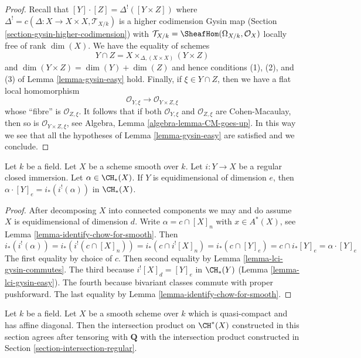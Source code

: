 \begin{proof}
Recall that $[Y] \cdot [Z] = \Delta^!([Y \times Z])$ where
$\Delta^! = c(\Delta : X \to X \times X, \mathcal{T}_{X/k})$
is a higher codimension Gysin map
(Section \ref{section-gysin-higher-codimension}) with
$\mathcal{T}_{X/k} = \SheafHom(\Omega_{X/k}, \mathcal{O}_X)$
locally free of rank $\dim(X)$. We have the equality of schemes
$$
Y \cap Z = X \times_{\Delta, (X \times X)} (Y \times Z)
$$
and $\dim(Y \times Z) = \dim(Y) + \dim(Z)$ and hence conditions 
(1), (2), and (3) of Lemma \ref{lemma-gysin-easy} hold.
Finally, if $\xi \in Y \cap Z$, then we have a flat local
homomorphism
$$
\mathcal{O}_{Y, \xi} \longrightarrow
\mathcal{O}_{Y \times Z, \xi}
$$
whose ``fibre'' is $\mathcal{O}_{Z, \xi}$. It follows that if both
$\mathcal{O}_{Y, \xi}$ and $\mathcal{O}_{Z, \xi}$
are Cohen-Macaulay, then so is $\mathcal{O}_{Y \times Z, \xi}$, see
Algebra, Lemma \ref{algebra-lemma-CM-goes-up}.
In this way we see that all the hypotheses of
Lemma \ref{lemma-gysin-easy} are satisfied and we conclude.
\end{proof}

\begin{lemma}
\label{lemma-intersect-regularly-embedded}
Let $k$ be a field. Let $X$ be a scheme smooth over $k$. Let $i : Y \to X$ be
a regular closed immersion. Let $\alpha \in \CH_*(X)$. If $Y$ is
equidimensional of dimension $e$, then
$\alpha \cdot [Y]_e = i_*(i^!(\alpha))$ in $\CH_*(X)$.
\end{lemma}

\begin{proof}
After decomposing $X$ into connected components we may and do assume $X$
is equidimensional of dimension $d$. Write $\alpha = c \cap [X]_n$
with $x \in A^*(X)$, see Lemma \ref{lemma-identify-chow-for-smooth}. Then
$$
i_*(i^!(\alpha)) = i_*(i^!(c \cap [X]_n)) =
i_*(c \cap i^![X]_n) = i_*(c \cap [Y]_e) =
c \cap i_*[Y]_e = \alpha \cdot [Y]_e
$$
The first equality by choice of $c$. Then second equality by
Lemma \ref{lemma-lci-gysin-commutes}. The third because
$i^![X]_d = [Y]_e$ in $\CH_*(Y)$ (Lemma \ref{lemma-lci-gysin-easy}).
The fourth because bivariant classes commute with proper pushforward.
The last equality by Lemma \ref{lemma-identify-chow-for-smooth}.
\end{proof}

\begin{lemma}
\label{lemma-intersection-regular-smooth}
Let $k$ be a field. Let $X$ be a smooth scheme over $k$ which is
quasi-compact and has affine diagonal. Then the intersection
product on $\CH^*(X)$ constructed in this section agrees
after tensoring with $\mathbf{Q}$ with the intersection product
constructed in Section \ref{section-intersection-regular}.
\end{lemma}

